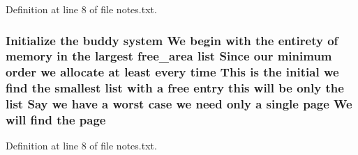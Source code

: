 Definition at line 8 of file notes.\+txt.

\subsubsection[{\texorpdfstring{page}{page}}]{\setlength{\rightskip}{0pt plus 5cm}Initialize the buddy system We begin with the entirety of memory {\bf in} the largest {\bf free\+\_\+area} {\bf list} Since our minimum {\bf order} we allocate at least every time This {\bf is} the initial we find the smallest {\bf list} with a free entry this will be only the {\bf list} Say we have a worst case we need only a single page We will find the page}\hypertarget{notes_8txt_af75b9551a58e7c4fa475d037e21d2e46}{}\label{notes_8txt_af75b9551a58e7c4fa475d037e21d2e46}


Definition at line 8 of file notes.\+txt.

